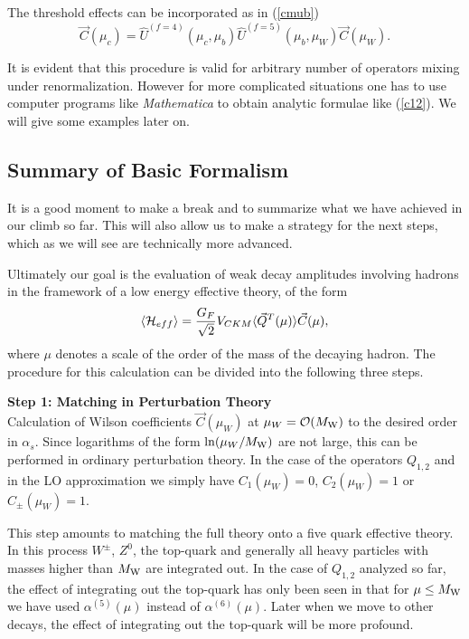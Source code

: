 \documentclass[12pt]{article}
\def\as{\alpha_s}
\newcommand{\mw}{M_{\rm W}}
\newcommand{\ord}{{\cal O}}
\begin{document}
\begin{itemize}
\begin{itemize}
\begin{itemize}
The threshold effects can be incorporated as in (\ref{cmub})
\begin{equation}\label{cmub1}
 \vec C(\mu_c)=\hat U^{(f=4)}(\mu_c,\mu_b)\hat U^{(f=5)}(\mu_b, \mu_W) 
\vec C(\mu_W).
\end{equation}

It is evident that this procedure is valid for arbitrary number
of operators mixing under renormalization. However for more
complicated situations one has to use computer programs like 
{\it Mathematica}
to obtain analytic formulae like (\ref{c12}). We will give
some examples later on.

\subsection{Summary of Basic Formalism }
            \label{sec:basicform:summary}
It is a good moment to make a break and to summarize what we have
achieved in our climb so far. This will also allow us to make
a strategy for the next steps, which as we will see are technically
more advanced.

Ultimately our goal is the evaluation of weak decay amplitudes
involving hadrons in the framework of a low energy effective theory,
of the form
\begin{displaymath}
\langle {\cal H}_{eff}\rangle={G_F\over\sqrt{2}}V_{CKM}
\langle \vec Q^T(\mu)\rangle \vec C(\mu),
\end{displaymath}
where $\mu$ denotes a scale of the order of the mass of the decaying
hadron.
The procedure for this calculation can be divided into the
following three steps.

\noindent
{\bf Step 1: Matching in Perturbation Theory}
\\
Calculation of Wilson coefficients $\vec C(\mu_W)$ at
$\mu_W=\ord(\mw)$ to the desired order in $\as$.  
Since
logarithms of the form $\ln(\mu_W/\mw)$ are not large, this can be
performed in ordinary perturbation theory. 
In the case
of the operators $Q_{1,2}$ and in the LO approximation we
simply have $C_1(\mu_W)=0$, $C_2(\mu_W)=1$ or $C_\pm(\mu_W)=1$.

This step
amounts to matching
the full theory onto a five quark effective theory.
In this process $W^\pm$, $Z^0$, the top-quark and generally
all heavy particles with masses higher than $\mw$ are integrated
out. In the case of $Q_{1,2}$ analyzed so far, the effect of 
integrating out the top-quark has only been seen in that for
$\mu\le\mw$ we have used $\alpha^{(5)}(\mu)$ instead of
 $\alpha^{(6)}(\mu)$. Later when we move to other decays,
the effect of integrating out the top-quark will be more profound.


\end{itemize}
\end{itemize}
\end{itemize}
\end{document}
